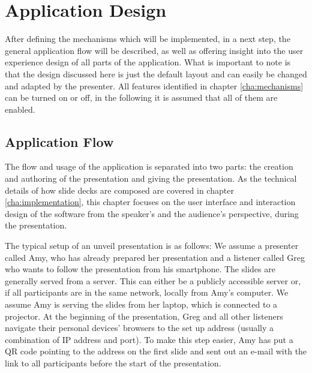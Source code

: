 \chapter{Application Design}
\label{cha:design}

After defining the mechanisms which will be implemented, in a next step, the general application flow will be described, as well as offering insight into the user experience design of all parts of the application. What is important to note is that the design discussed here is just the default layout and can easily be changed and adapted by the presenter. All features identified in chapter \ref{cha:mechanisms} can be turned on or off, in the following it is assumed that all of them are enabled.

\section{Application Flow}
The flow and usage of the application is separated into two parts: the creation and authoring of the presentation and giving the presentation. As the technical details of how slide decks are composed are covered in chapter \ref{cha:implementation}, this chapter focuses on the user interface and interaction design of the software from the speaker's and the audience's perspective, during the presentation.

The typical setup of an unveil presentation is as follows: We assume a presenter called Amy, who has already prepared her presentation and a listener called Greg who wants to follow the presentation from his smartphone.
The slides are generally served from a server. This can either be a publicly accessible server or, if all participants are in the same network, locally from Amy's computer. We assume Amy is serving the slides from her laptop, which is connected to a projector.
At the beginning of the presentation, Greg and all other listeners navigate their personal devices' browsers to the set up address (usually a combination of IP address and port). To make this step easier, Amy has put a QR code pointing to the address on the first slide and sent out an e-mail with the link to all participants before the start of the presentation.

